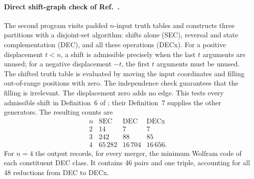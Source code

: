 \documentclass[11pt,a4paper]{article}
\newenvironment{revision}{\color{blue}}{}
\newenvironment{revision}{\color{black}}{}
\begin{document}
\begin{revision}
\paragraph{Direct shift-graph check of Ref.\ \cite{RUIVO2018280}.}
The second program visits padded $n$-input truth tables and constructs
three partitions with a disjoint-set algorithm: shifts alone (SEC),
reversal and state complementation (DEC), and all these operations (DECx).
For a positive displacement $t<n$, a shift is admissible precisely when
the last $t$ arguments are unused; for a negative displacement $-t$, the
first $t$ arguments must be unused. The shifted truth table is evaluated
by moving the input coordinates and filling out-of-range positions with
zero. The independence check guarantees that the filling is irrelevant.
The displacement zero adds no edge. This tests every admissible shift
in Definition~6 of \cite{RUIVO2018280}; their Definition~7 supplies the
other generators. The resulting counts are
\[
\begin{array}{c|rrr}
n&\mathrm{SEC}&\mathrm{DEC}&\mathrm{DECx}\\\hline
2&14&7&7\\
3&242&88&85\\
4&65\,282&16\,704&16\,656.
\end{array}
\]
For $n=4$ the output records, for every merger, the minimum Wolfram code
of each constituent DEC class. It contains 46 pairs and one triple,
accounting for all 48 reductions from DEC to DECx.
\end{revision}
\end{document}
